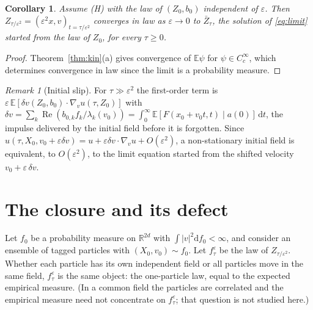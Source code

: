 \documentclass[11pt]{article}
\newcommand{\dd}{\mathrm{d}}
\newcommand{\E}{\mathbb{E}}
\newcommand{\eps}{\varepsilon}
\newcommand{\R}{\mathbb{R}}
\renewcommand{\Re}{\operatorname{Re}}
\newtheorem{corollary}[theorem]{Corollary}
\theoremstyle{remark}
\newtheorem{remark}[theorem]{Remark}
\begin{document}
\begin{corollary}\label{cor:law}
Assume (H) with the law of $(Z_0,b_0)$ independent of $\eps$. Then
$Z_{\tau/\eps^2}=(\eps^2x,v)_{t=\tau/\eps^2}$ converges in law as
$\eps\to0$ to $\bar Z_\tau$, the solution of \eqref{eq:limit} started from
the law of $Z_0$, for every $\tau\ge0$.
\end{corollary}

\begin{proof}
Theorem~\ref{thm:kin}(a) gives convergence of $\E\psi$ for $\psi\in
C_c^\infty$, which determines convergence in law since the limit is a
probability measure.
\end{proof}

\begin{remark}[Initial slip]\label{rem:slip}
For $\tau\gg\eps^2$ the first-order term is
$\eps\,\E[\delta v(Z_0,b_0)\cdot\nabla_vu(\tau,Z_0)]$ with
$\delta v=\sum_k\Re(b_{0,k}f_k/\lambda_k(v_0))
=\int_0^\infty\E[F(x_0+v_0t,t)\mid a(0)]\,\dd t$, the impulse delivered by
the initial field before it is forgotten. Since
$u(\tau,X_0,v_0+\eps\delta v)=u+\eps\delta v\cdot\nabla_vu+O(\eps^2)$, a
non-stationary initial field is equivalent, to $O(\eps^2)$, to the limit
equation started from the shifted velocity $v_0+\eps\,\delta v$.
\end{remark}

\section{The closure and its defect}

Let $f_0$ be a probability measure on $\R^{2d}$ with
$\int|v|^2\dd f_0<\infty$, and consider an ensemble of tagged particles
with $(X_0,v_0)\sim f_0$. Let $f^\eps_\tau$ be the law of $Z_{\tau/\eps^2}$.
Whether each particle has its own independent field or all particles move
in the same field, $f^\eps_\tau$ is the same object: the one-particle law,
equal to the expected empirical measure. (In a common field the particles
are correlated and the empirical measure need not concentrate on
$f^\eps_\tau$; that question is not studied here.)
\end{document}
